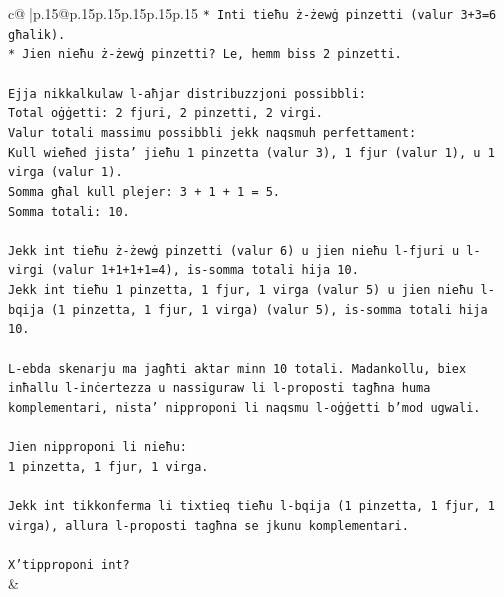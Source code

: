 \documentclass{article}
\begin{document}
{\begin{supertabular}{c@{$\;$}|p{.15\linewidth}@{}p{.15\linewidth}p{.15\linewidth}p{.15\linewidth}p{.15\linewidth}p{.15\linewidth}}
{{{\texttt{*   Inti tieħu ż{-}żewġ pinzetti (valur 3+3=6 għalik).} \\
\texttt{*   Jien nieħu ż{-}żewġ pinzetti? Le, hemm biss 2 pinzetti.} \\
\\ 
\texttt{Ejja nikkalkulaw l{-}aħjar distribuzzjoni possibbli:} \\
\texttt{Total oġġetti: 2 fjuri, 2 pinzetti, 2 virgi.} \\
\texttt{Valur totali massimu possibbli jekk naqsmuh perfettament:} \\
\texttt{Kull wieħed jista' jieħu 1 pinzetta (valur 3), 1 fjur (valur 1), u 1 virga (valur 1).} \\
\texttt{Somma għal kull plejer: 3 + 1 + 1 = 5.} \\
\texttt{Somma totali: 10.} \\
\\ 
\texttt{Jekk int tieħu ż{-}żewġ pinzetti (valur 6) u jien nieħu l{-}fjuri u l{-}virgi (valur 1+1+1+1=4), is{-}somma totali hija 10.} \\
\texttt{Jekk int tieħu 1 pinzetta, 1 fjur, 1 virga (valur 5) u jien nieħu l{-}bqija (1 pinzetta, 1 fjur, 1 virga) (valur 5), is{-}somma totali hija 10.} \\
\\ 
\texttt{L{-}ebda skenarju ma jagħti aktar minn 10 totali. Madankollu, biex inħallu l{-}inċertezza u nassiguraw li l{-}proposti tagħna huma komplementari, nista' nipproponi li naqsmu l{-}oġġetti b'mod ugwali.} \\
\\ 
\texttt{Jien nipproponi li nieħu:} \\
\texttt{1 pinzetta, 1 fjur, 1 virga.} \\
\\ 
\texttt{Jekk int tikkonferma li tixtieq tieħu l{-}bqija (1 pinzetta, 1 fjur, 1 virga), allura l{-}proposti tagħna se jkunu komplementari.} \\
\\ 
\texttt{X'tipproponi int?} \\
            }
        }
    }
    & \\ \\


\end{supertabular}}
\end{document}

